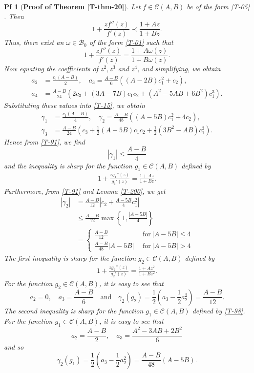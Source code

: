 \documentclass[10pt,a4paper]{amsart}
\newtheorem{pf}{Pf}
\begin{document}
\begin{pf}[\textbf{Proof of Theorem \ref{T-thm-20}}]
Let $ f \in \mathcal{C}(A,B) $ be of the form \eqref{T-05} . Then
$$
1 + \frac{zf''(z)}{f'(z)} \prec \frac{1+Az}{1+Bz}.
$$  
Thus, there exist an $\omega\in\mathcal{B}_0$ of the form \eqref{T-01} such that
$$
1 + \frac{zf''(z)}{f'(z)} = \frac{1+A \omega(z)}{1+B \omega(z)}.
$$
Now equating the coefficients of $z^2,z^3$ and $z^4$, and simplifying, we obtain
    \begin{align*}
    a_2&=\frac{c_1(A-B)}{2}, \quad a_3=\frac{A-B}{6}\left((A-2B)c_1^2+c_2\right),\\
    a_4&= \frac{A-B}{24}\left(2c_3+(3A-7B)c_{1}c_{2}+(A^2-5AB+6B^2)c_1^3\right).
    \end{align*}
Substituting these values into \eqref{T-15}, we obtain
\begin{align}
    \gamma_1&=\frac{c_1(A-B)}{4}, \quad \gamma_2=\frac{A-B}{48}\left((A-5B)c_1^2+4c_2\right),\label{T-91}\\
    \gamma_3&= \frac{A-B}{24}\left(c_3+\frac{1}{2}(A-5B)c_{1}c_{2}+\frac{1}{2}(3B^2-AB)c_1^3\right).\label{T-92}
    \end{align}
Hence from \eqref{T-91}, we find
    $$
     |\gamma_1| \leq \frac{A - B}{4}
    $$
    and the inequality is sharp for the function $g_1\in\mathcal{C}(A,B)$ defined by
\begin{align}\label{T-98}
1 + \frac{zg_1''(z)}{g_1'(z)} = \frac{1+Az}{1+B z}.
\end{align}
Furthermore, from \eqref{T-91} and Lemma \ref{T-200}, we get
\begin{align*}
|\gamma_2|
&=\frac{A-B}{12}\left|c_2+\frac{A-5B}{4}c_1^2\right|\\
&\le \frac{A-B}{12}\max\left\{1,\frac{|A-5B|}{4}\right\}\\
& =\begin{cases}\frac{A-B}{12} & ~~\text{for}~ |A-5B|\le 4\\[2mm]
\frac{A-B}{48}|A-5B| & ~~\text{for}~ |A-5B|>4
 \end{cases}
\end{align*}
The first inequality is sharp for the function $g_2\in\mathcal{C}(A,B)$ defined by
\begin{align}\label{T-93}
1 + \frac{zg_2''(z)}{g_2'(z)} = \frac{1+Az^2}{1+Bz^2}.
\end{align}
For the function $g_2\in\mathcal{C}(A,B)$, it is easy to see that
$$
a_2=0,\quad a_3=\frac{A-B}{6}\quad\text{and}\quad\gamma_2(g_2)=\frac{1}{2}\left(a_3-\frac{1}{2}a_2^2\right)=\frac{A-B}{12}.
$$
The second inequality is sharp for the function $g_1\in\mathcal{C}(A,B)$ defined by \eqref{T-98}. For the function $g_1\in\mathcal{C}(A,B)$, it is easy to see that
$$
a_2=\frac{A-B}{2},\quad a_3=\frac{A^2-3AB+2B^2}{6}
$$
and so 
$$\gamma_2(g_1)=\frac{1}{2}\left(a_3-\frac{1}{2}a_2^2\right)=\frac{A-B}{48}(A-5B).$$





\end{pf}
\end{document}
